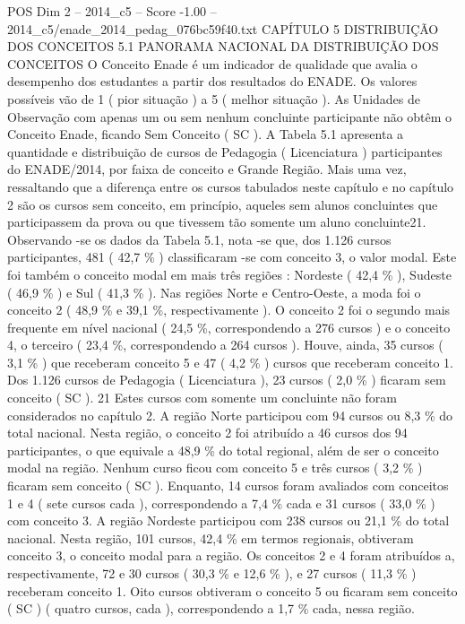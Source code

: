 \begin{textsample}{POS Dim 2 – 2014\_c5 – Score -1.00 – 2014\_c5/enade\_2014\_pedag\_076bc59f40.txt}  \label{ex:f2_pos_310}
CAPÍTULO 5 DISTRIBUIÇÃO DOS CONCEITOS 5.1 PANORAMA NACIONAL DA DISTRIBUIÇÃO DOS CONCEITOS O Conceito Enade é um indicador de qualidade que avalia o desempenho dos estudantes a partir dos resultados do ENADE.
Os valores possíveis vão de 1 ( pior situação ) a 5 ( melhor situação ).
As Unidades de Observação com apenas um ou sem nenhum concluinte participante não obtêm o Conceito Enade, ficando Sem Conceito ( SC ).
A Tabela 5.1 apresenta a quantidade e distribuição de cursos de Pedagogia ( Licenciatura ) participantes do ENADE/2014, por faixa de conceito e Grande Região.
Mais uma vez, ressaltando que a diferença entre os cursos tabulados neste capítulo e no capítulo 2 são os cursos sem conceito, em princípio, aqueles sem alunos concluintes que participassem da prova ou que tivessem tão somente um aluno concluinte21.
Observando -se os dados da Tabela 5.1, nota -se que, dos 1.126 cursos participantes, 481 ( 42,7 \% ) classificaram -se com conceito 3, o valor modal.
Este foi também o conceito modal em mais três regiões : Nordeste ( 42,4 \% ), Sudeste ( 46,9 \% ) e Sul ( 41,3 \% ).
Nas regiões Norte e Centro-Oeste, a moda foi o conceito 2 ( 48,9 \% e 39,1 \%, respectivamente ).
O conceito 2 foi o segundo mais frequente em nível nacional ( 24,5 \%, correspondendo a 276 cursos ) e o conceito 4, o terceiro ( 23,4 \%, correspondendo a 264 cursos ).
Houve, ainda, 35 cursos ( 3,1 \% ) que receberam conceito 5 e 47 ( 4,2 \% ) cursos que receberam conceito 1.
Dos 1.126 cursos de Pedagogia ( Licenciatura ), 23 cursos ( 2,0 \% ) ficaram sem conceito ( SC ). 21 Estes cursos com somente um concluinte não foram considerados no capítulo 2.
A região Norte participou com 94 cursos ou 8,3 \% do total nacional.
Nesta região, o conceito 2 foi atribuído a 46 cursos dos 94 participantes, o que equivale a 48,9 \% do total regional, além de ser o conceito modal na região.
Nenhum curso ficou com conceito 5 e três cursos ( 3,2 \% ) ficaram sem conceito ( SC ).
Enquanto, 14 cursos foram avaliados com conceitos 1 e 4 ( sete cursos cada ), correspondendo a 7,4 \% cada e 31 cursos ( 33,0 \% ) com conceito 3.
A região Nordeste participou com 238 cursos ou 21,1 \% do total nacional.
Nesta região, 101 cursos, 42,4 \% em termos regionais, obtiveram conceito 3, o conceito modal para a região.
Os conceitos 2 e 4 foram atribuídos a, respectivamente, 72 e 30 cursos ( 30,3 \% e 12,6 \% ), e 27 cursos ( 11,3 \% ) receberam conceito 1.
Oito cursos obtiveram o conceito 5 ou ficaram sem conceito ( SC ) ( quatro cursos, cada ), correspondendo a 1,7 \% cada, nessa região.

\end{textsample}
